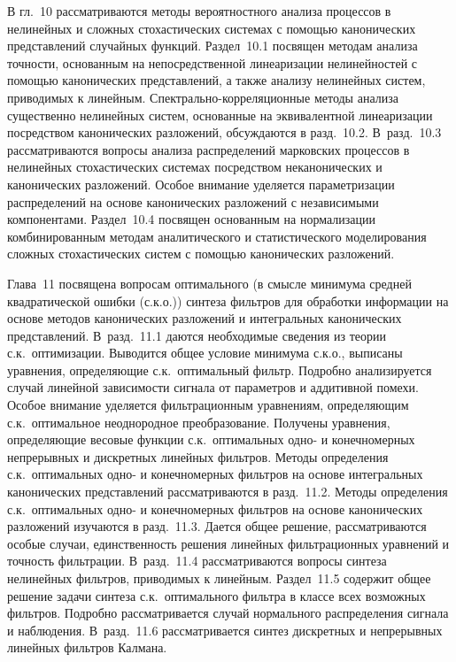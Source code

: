 \begin{multicols}{2}
{{      В гл.~10 рассматриваются методы вероятностного анализа процессов в 
нелинейных и сложных стохастических системах с помощью канонических 
представлений случайных функций. Раздел~10.1 посвящен методам анализа  точности, 
основанным на непосредственной линеаризации нелинейностей с помощью канонических 
пред\-став\-ле\-ний, а также анализу нелинейных систем, приводимых к линейным. 
Спектрально-корреляционные методы анализа существенно нелинейных систем, 
основанные на эквивалентной линеаризации посредством канонических разложений, 
обсуждаются в разд.~10.2. В~разд.~10.3 рассматриваются вопросы анализа 
распределений марковских процессов в нелинейных стохастических системах 
посредством неканонических и канонических разложений. Особое внимание уделяется 
параметризации распределений на основе канонических разложений с независимыми 
компонентами. Раздел~10.4 посвящен основанным на нормализации комбинированным 
методам аналитического и статистического моделирования сложных стохастических 
систем с помощью канонических разложений. 
      
      \def\leftkol{РЕЦЕНЗИИ}

\def\rightkol{РЕЦЕНЗИИ} 

      Глава~11 посвящена вопросам оптимального (в смыс\-ле минимума средней квадратической
      ошибки (с.к.о.)) синтеза 
фильтров для обработки информации на основе методов канонических разложений и 
интегральных канонических представлений. В~разд.~11.1 даются необходимые 
сведения из теории с.к.\ оптимизации. Выводится общее условие минимума с.к.о., 
выписаны уравнения, определяющие с.к.\ оптимальный фильтр. Подробно анализируется 
случай линейной зависимости сигнала от параметров и аддитивной помехи. Особое 
внимание уделяется фильтрационным уравнениям, определяющим с.к.\ оптимальное 
неоднородное преобразование. Получены уравнения, определяющие весовые функции с.к.\
оптимальных одно- и конечномерных непрерывных и дискретных линейных фильтров. 
Методы определения с.к.\ оптимальных одно- и конечномерных фильтров на основе 
интегральных канонических представлений рассматриваются в разд.~11.2. Методы 
определения с.к.\ оптимальных одно- и конечномерных фильтров на основе канонических 
разложений изучаются в разд.~11.3. Дается общее решение, рассматриваются особые 
случаи, единственность решения линейных фильтрационных уравнений и точность 
фильтрации. В~разд.~11.4 рассматриваются вопросы синтеза нелинейных фильтров, 
приводимых к линейным. Раздел~11.5 содержит общее решение задачи синтеза с.к.\ 
оптимального фильтра в классе всех возможных фильтров. Подробно рассматривается 
случай нормального распределения сигнала и наблюдения. В~разд.~11.6 
рассматривается синтез дискретных и непрерывных линейных фильтров Калмана. 
      
}}
\end{multicols}
